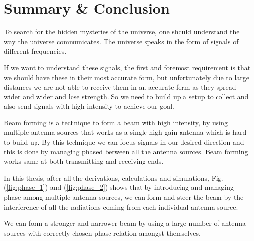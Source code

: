 \chapter{Summary \& Conclusion}

To search for the hidden mysteries of the universe, one should understand the way the universe communicates. The universe speaks in the form of signals of different frequencies.

If we want to understand these signals, the first and foremost requirement is that we should have these in their most accurate form, but unfortunately due to large distances we are not able to receive them in an accurate form as they spread wider and wider and lose strength. So we need to build up a setup to collect and also send signals with high intensity to achieve our goal.

Beam forming is a technique to form a beam with high intensity, by using multiple antenna sources that works as a single high gain antenna which is hard to build up. By this technique we can focus signals in our desired direction and this is done by managing phased between all the antenna sources. Beam forming works same at both transmitting and receiving ends.

In this thesis, after all the derivations, calculations and simulations, Fig. (\ref{fig:phase_1}) and (\ref{fig:phase_2}) shows that by introducing and managing phase among multiple antenna sources, we can form and steer the beam by the interference of all the radiations coming from each individual antenna source.

We can form a stronger and narrower beam by using a large number of antenna sources with correctly chosen phase relation amongst themselves.
